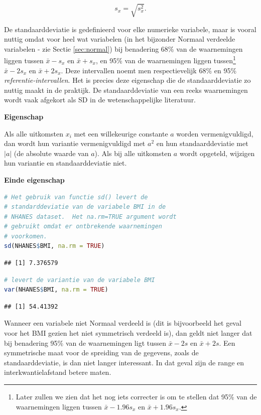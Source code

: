 \documentclass[
  12pt,dutch,coursenotes]{book}
\theoremstyle{definition}
\theoremstyle{definition}
\theoremstyle{definition}
\theoremstyle{definition}
\theoremstyle{remark}
\begin{document}
\begin{equation*}
s_x= \sqrt{s_x^2} .
\end{equation*}

De standaarddeviatie is gedefinieerd voor elke numerieke variabele, maar is
vooral nuttig omdat voor heel wat variabelen (in het bijzonder Normaal
verdeelde variabelen - zie Sectie \ref{sec:normal}) bij benadering 68\% van
de waarnemingen liggen tussen \(\bar{x} - s_x\) en \(\bar{x} + s_x\), en 95\%
van de waarnemingen liggen tussen\footnote{Later zullen we zien dat het nog iets correcter is om te stellen dat 95\% van de waarnemingen liggen tussen \(\bar{x} - 1.96 s_x\) en \(\bar{x} + 1.96 s_x\).}
\(\bar{x} - 2 s_x\) en \(\bar{x} + 2 s_x\). Deze intervallen noemt men respectievelijk 68\% en 95\% \emph{referentie-intervallen}. Het is precies deze eigenschap die de
standaarddeviatie zo nuttig maakt in de praktijk. De standaarddeviatie van
een reeks waarnemingen wordt vaak afgekort als SD in de wetenschappelijke literatuur.

\textbf{Eigenschap}

Als alle uitkomsten \(x_i\) met een willekeurige constante \(a\)
worden vermenigvuldigd, dan wordt hun variantie vermenigvuldigd met \(a^2\) en
hun standaarddeviatie met \(|a|\) (de absolute waarde van \(a\)). Als bij alle
uitkomsten \(a\) wordt opgeteld, wijzigen hun variantie en standaarddeviatie
niet.

\textbf{Einde eigenschap}

\begin{lstlisting}[language=R]
# Het gebruik van functie sd() levert de
# standarddeviatie van de variabele BMI in de
# NHANES dataset.  Het na.rm=TRUE argument wordt
# gebruikt omdat er ontbrekende waarnemingen
# voorkomen.
sd(NHANES$BMI, na.rm = TRUE)
\end{lstlisting}

\begin{lstlisting}
## [1] 7.376579
\end{lstlisting}

\begin{lstlisting}[language=R]
# levert de variantie van de variabele BMI
var(NHANES$BMI, na.rm = TRUE)
\end{lstlisting}

\begin{lstlisting}
## [1] 54.41392
\end{lstlisting}

Wanneer een variabele niet Normaal verdeeld is (dit is bijvoorbeeld het
geval voor het BMI gezien het niet symmetrisch verdeeld is), dan
geldt niet langer dat bij benadering 95\% van de waarnemingen ligt tussen \(\bar{x} - 2 s\) en \(\bar{x} + 2 s\). Een symmetrische maat voor de spreiding
van de gegevens, zoals de standaarddeviatie, is dan niet langer interessant.
In dat geval zijn de range en interkwantielafstand betere maten.
\end{document}

